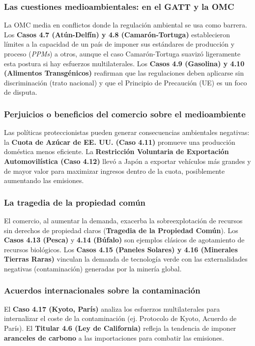 \subsubsection{Las cuestiones medioambientales: en el GATT y la OMC}
La OMC media en conflictos donde la regulación ambiental se usa como barrera. Los \textbf{Casos 4.7 (Atún-Delfín) y 4.8 (Camarón-Tortuga)} establecieron límites a la capacidad de un país de imponer sus estándares de producción y proceso (\textit{PPMs}) a otros, aunque el caso Camarón-Tortuga suavizó ligeramente esta postura si hay esfuerzos multilaterales. Los \textbf{Casos 4.9 (Gasolina) y 4.10 (Alimentos Transgénicos)} reafirman que las regulaciones deben aplicarse sin discriminación (trato nacional) y que el Principio de Precaución (UE) es un foco de disputa.

\subsubsection{Perjuicios o beneficios del comercio sobre el medioambiente}
Las políticas proteccionistas pueden generar consecuencias ambientales negativas: la \textbf{Cuota de Azúcar de EE. UU. (Caso 4.11)} promueve una producción doméstica menos eficiente. La \textbf{Restricción Voluntaria de Exportación Automovilística (Caso 4.12)} llevó a Japón a exportar vehículos más grandes y de mayor valor para maximizar ingresos dentro de la cuota, posiblemente aumentando las emisiones.

\subsubsection{La tragedia de la propiedad común}
El comercio, al aumentar la demanda, exacerba la sobreexplotación de recursos sin derechos de propiedad claros (\textbf{Tragedia de la Propiedad Común}). Los \textbf{Casos 4.13 (Pesca)} y \textbf{4.14 (Búfalo)} son ejemplos clásicos de agotamiento de recursos biológicos. Los \textbf{Casos 4.15 (Paneles Solares) y 4.16 (Minerales Tierras Raras)} vinculan la demanda de tecnología verde con las externalidades negativas (contaminación) generadas por la minería global.

\subsubsection{Acuerdos internacionales sobre la contaminación}
El \textbf{Caso 4.17 (Kyoto, París)} analiza los esfuerzos multilaterales para internalizar el coste de la contaminación (ej. Protocolo de Kyoto, Acuerdo de París). El \textbf{Titular 4.6 (Ley de California)} refleja la tendencia de imponer \textbf{aranceles de carbono} a las importaciones para combatir las emisiones.

